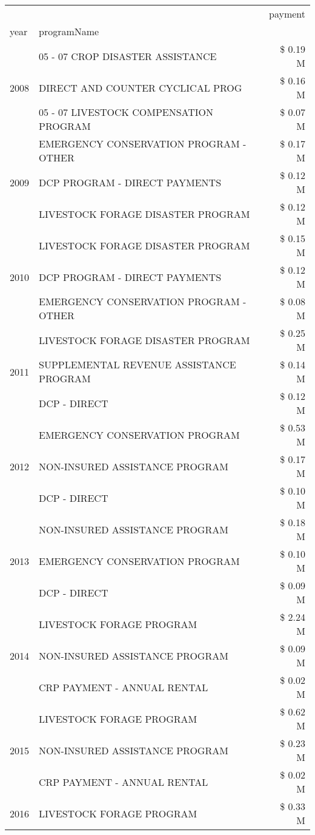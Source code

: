 \begin{tabular}{llr}
\toprule
 &  & payment \\
year & programName &  \\
\midrule
\multirow[t]{3}{*}{2008} & 05 - 07 CROP DISASTER ASSISTANCE & \$ 0.19 M \\
 & DIRECT AND COUNTER CYCLICAL PROG & \$ 0.16 M \\
 & 05 - 07 LIVESTOCK COMPENSATION PROGRAM & \$ 0.07 M \\
\cline{1-3}
\multirow[t]{3}{*}{2009} & EMERGENCY CONSERVATION PROGRAM - OTHER & \$ 0.17 M \\
 & DCP PROGRAM - DIRECT PAYMENTS & \$ 0.12 M \\
 & LIVESTOCK FORAGE DISASTER  PROGRAM & \$ 0.12 M \\
\cline{1-3}
\multirow[t]{3}{*}{2010} & LIVESTOCK FORAGE DISASTER  PROGRAM & \$ 0.15 M \\
 & DCP PROGRAM - DIRECT PAYMENTS & \$ 0.12 M \\
 & EMERGENCY CONSERVATION PROGRAM - OTHER & \$ 0.08 M \\
\cline{1-3}
\multirow[t]{3}{*}{2011} & LIVESTOCK FORAGE DISASTER PROGRAM & \$ 0.25 M \\
 & SUPPLEMENTAL REVENUE ASSISTANCE PROGRAM & \$ 0.14 M \\
 & DCP - DIRECT & \$ 0.12 M \\
\cline{1-3}
\multirow[t]{3}{*}{2012} & EMERGENCY CONSERVATION PROGRAM & \$ 0.53 M \\
 & NON-INSURED ASSISTANCE PROGRAM & \$ 0.17 M \\
 & DCP - DIRECT & \$ 0.10 M \\
\cline{1-3}
\multirow[t]{3}{*}{2013} & NON-INSURED ASSISTANCE PROGRAM & \$ 0.18 M \\
 & EMERGENCY CONSERVATION PROGRAM & \$ 0.10 M \\
 & DCP - DIRECT & \$ 0.09 M \\
\cline{1-3}
\multirow[t]{3}{*}{2014} & LIVESTOCK FORAGE PROGRAM & \$ 2.24 M \\
 & NON-INSURED ASSISTANCE PROGRAM & \$ 0.09 M \\
 & CRP PAYMENT - ANNUAL RENTAL & \$ 0.02 M \\
\cline{1-3}
\multirow[t]{3}{*}{2015} & LIVESTOCK FORAGE PROGRAM & \$ 0.62 M \\
 & NON-INSURED ASSISTANCE PROGRAM & \$ 0.23 M \\
 & CRP PAYMENT - ANNUAL RENTAL & \$ 0.02 M \\
\cline{1-3}
\multirow[t]{3}{*}{2016} & LIVESTOCK FORAGE PROGRAM & \$ 0.33 M \\

\end{tabular}
